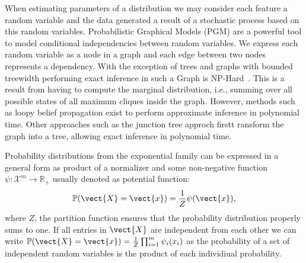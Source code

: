 When estimating parameters of a distribution we may consider each feature a random variable and the data generated a result of a stochastic process based on this random variables.
Probabilistic Graphical Models (PGM) are a powerful tool to model conditional independencies between random variables. 
We express each random variable as a node in a graph and each edge between two nodes represents a dependency. 
With the exception of trees and graphs with bounded treewidth performing exact inference in such a Graph is NP-Hard~\cite{cooper1990computational}.
This is a result from having to compute the marginal distribution, i.e., summing over all possible states of all maximum cliques inside the graph.
However, methods such as loopy belief propagation exist to perform approximate inference in polynomial time.
Other approaches such as the junction tree approch firstt ransform the graph into a tree, allowing exact inference in polynomial time.

Probability distributions from the exponential family can be expressed in a general form as product of a normalizer and some non-negative function $\psi: \mathcal{X}^m \rightarrow \mathbb{R}_+$ usually denoted as potential function:
\begin{equation}
    \label{eq:probpot}
    \mathbb{P}(\vect{X} = \vect{x}) = \frac{1}{Z} \psi(\vect{x}),
\end{equation}
where $Z$, the partition function ensures that the probability distribution properly sums to one.
If all entries in $\vect{X}$ are independent from each other we can write $\mathbb{P}(\vect{X} = \vect{x}) = \frac{1}{Z} \prod_{i=1}^m \psi_i(x_i)$ as the probability of a set of independent random variables is the product of each individiual probability.

